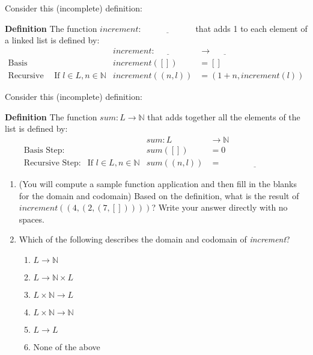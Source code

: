 \documentclass[12pt, oneside]{article}
\begin{document}
\begin{enumerate}
Consider this (incomplete) definition:

{\bf Definition} The function $\textit{increment} : \underline{\hspace{6em}}$ that adds 1 to each element of a linked list is defined by:
\[
\begin{array}{llll}
& & \textit{increment} : \underline{\hspace{3em}} & \to \underline{\hspace{3em}} \\
\textrm{Basis Step:} & & \textit{increment}([]) & = [] \\
\textrm{Recursive Step:} & \textrm{If } l \in L, n \in \mathbb{N} & \textit{increment}((n, l)) & = (1 + n, \textit{increment}(l))
\end{array}
\]

Consider this (incomplete) definition:

{\bf Definition} The function $\textit{sum} : L \to \mathbb{N}$ that adds together all the elements of the list is defined by:
\[
\begin{array}{llll}
& & \textit{sum} : L & \to \mathbb{N} \\
\textrm{Basis Step:} & & \textit{sum}([]) & = 0 \\
\textrm{Recursive Step:} & \textrm{If } l \in L, n \in \mathbb{N} & \textit{sum}((n, l)) & = \underline{\hspace{8em}}
\end{array}
\]


\begin{enumerate}
    \item (You will compute a sample function application and then fill in the blanks for the domain and codomain) Based on the definition, what is the result of $\textit{increment}((4, (2, (7, []))))$? Write your answer directly with no spaces.
    
    \item Which of the following describes the domain and codomain of \textit{increment}?
    
    \begin{multicols}{2}
    \begin{enumerate}
        \item $L \to \mathbb{N}$
        \item $L \to \mathbb{N} \times L$
        \item $L \times \mathbb{N} \to L$
        \item $L \times \mathbb{N} \to \mathbb{N}$
        \item $L \to L$
        \item None of the above
    \end{enumerate}
    \end{multicols}
    

\end{enumerate}
\end{enumerate}
\end{document}
